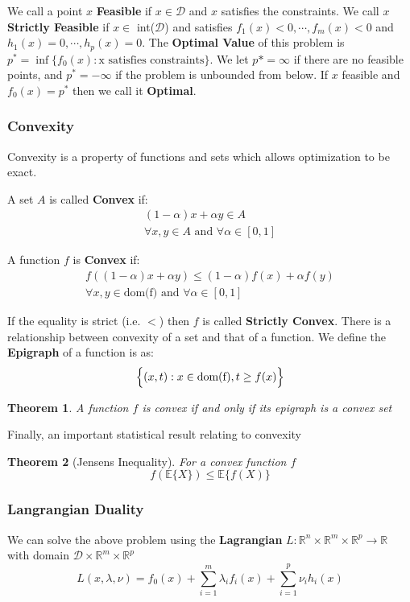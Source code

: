 \documentclass[]{article}
\theoremstyle{mattstyle}
\newtheorem{theorem}{Theorem}[section]
\theoremstyle{definition}
\begin{document}
We call a point $x$ \textbf{Feasible} if $x\in \mathcal{D}$ and $x$ satisfies the constraints. We call $x$ \textbf{Strictly Feasible} if $x\in$ int($\mathcal{D}$) and satisfies $f_1(x)<0, \cdots, f_m(x)<0$ and $h_1(x)=0, \cdots, h_p(x)=0$. The \textbf{Optimal Value} of this problem is $p^*=\inf\{f_0(x): \text{x satisfies constraints}\}$. We let $p* = \infty$ if there are no feasible points, and $p^*=-\infty$ if the problem is unbounded from below. If $x$ feasible and $f_0(x) = p^*$ then we call it \textbf{Optimal}.

\subsubsection{Convexity}

Convexity is a property of functions and sets which allows optimization to be exact.

A set $A$ is called \textbf{Convex} if:
\begin{align*}
(1-\alpha)x + \alpha y \in A \\
\forall x,y\in A \text{ and } \forall\alpha \in [0,1]
\end{align*} 

A function $f$ is \textbf{Convex} if:
\begin{align*}
f((1-\alpha)x + \alpha y) \le (1-\alpha)f(x) + \alpha f(y)\\
\forall x,y\in \text{dom(f)}\text{ and } \forall\alpha \in [0,1]
\end{align*} 

If the equality is strict (i.e. $<$) then $f$ is called \textbf{Strictly Convex}. There is a relationship between convexity of a set and that of a function. We define the \textbf{Epigraph} of a function is as:
$$\Bigl\{ (x,t): x\in \text{dom(f)}, t\ge f(x) \Bigr\}$$

\begin{theorem}
	A function $f$ is convex if and only if its epigraph is a convex set
\end{theorem}

Finally, an important statistical result relating to convexity

\begin{theorem}[Jensens Inequality]
	For a convex function $f$ $$f(\mathbb{E}\{X\})\le\mathbb{E}\{f(X)\}$$
\end{theorem}

\subsubsection{Langrangian Duality}
We can solve the above problem using the \textbf{Lagrangian} $L: \mathbb{R}^n\times \mathbb{R}^m\times \mathbb{R}^p \rightarrow \mathbb{R} $ with domain $\mathcal{D}\times\mathbb{R}^m\times \mathbb{R}^p$
\begin{equation}\label{eq:primal}
L(x,\lambda,\nu) = f_0(x) + \sum_{i=1}^m \lambda_if_i(x) + \sum_{i=1}^p \nu_i h_i(x)
\end{equation}
\end{document}
